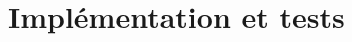 \documentclass[a4paper,10pt]{report}
\begin{document}
%
%
%
%
%
%

\chapter{Implémentation et tests}
    
\end{document}
